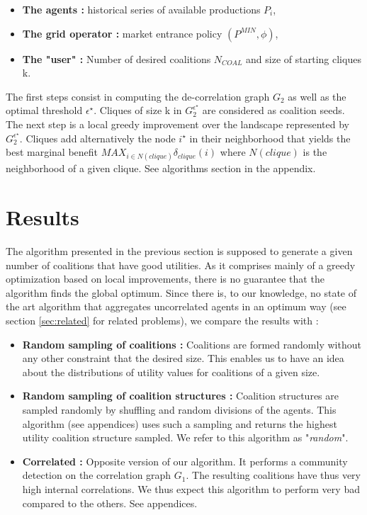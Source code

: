 \documentclass[journal]{IEEEtran}
\begin{document}
\begin{itemize}
	\item \textbf{The agents :} historical series of available productions $P_{i}$, 
	\item \textbf{The grid operator :} market entrance policy $ (P^{MIN},\phi) $,
	\item \textbf{The "user" :} Number of desired coalitions $ N_{COAL} $ and size of starting cliques k.
\end{itemize} 

The first steps consist in computing the de-correlation graph $ G_{2} $ as well as the optimal threshold $ \epsilon^{\star} $. Cliques of size k in $ G_{2}^{\epsilon^{\star}} $ are considered as coalition seeds. The next step is a local greedy improvement over the landscape represented by  $ G_{2}^{\epsilon^{\star}} $. Cliques add alternatively the node $ i^{\star} $ in their neighborhood that yields the best marginal benefit $ MAX_{ i \in N(clique) } \delta_{clique}(i) $ where $ N(clique) $ is the neighborhood of a given clique. See algorithms section in the appendix.


%
%
\section{Results}
\label{sec:results}

The algorithm presented in the previous section is supposed to generate a given number of coalitions that have good utilities. As it comprises mainly of a greedy optimization based on local improvements, there is no guarantee that the algorithm finds the global optimum. Since there is, to our knowledge, no state of the art algorithm that aggregates uncorrelated agents in an optimum way (see section \ref{sec:related} for related problems), we compare the results with :

\begin{itemize}
\item \textbf{Random sampling of coalitions :} Coalitions are formed randomly without any other constraint that the desired size. This enables us to have an idea about the distributions of utility values for coalitions of a given size.
\item \textbf{Random sampling of coalition structures :} Coalition structures are sampled randomly by shuffling and random divisions of the agents. This algorithm (see appendices) uses such a sampling and returns the highest utility coalition structure sampled. We refer to this algorithm as "\textit{random}".
\item \textbf{Correlated :} Opposite version of our algorithm. It performs a community detection on the correlation graph $ G_{1} $. The resulting coalitions have thus very high internal correlations. We thus expect this algorithm to perform very bad compared to the others. See appendices.
\end{itemize} 
\end{document}
